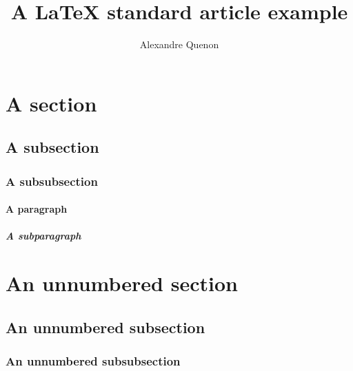 \documentclass[11pt, a4paper]{article}
\title{A \LaTeX{} standard article example}
\author{Alexandre Quenon}
\begin{document}

\maketitle

\tableofcontents


\section{A section}

	\lipsum[1]
	
	
	\subsection{A subsection}
	
		\lipsum[2]
		
		
		\subsubsection{A subsubsection}
		
			\lipsum[3]
			
			
			\paragraph{A paragraph}
			
				\lipsum[4]
				
				
				\subparagraph{A subparagraph}
				
					\lipsum[5]


\section*{An unnumbered section}

	\lipsum[1]
	
	
	\subsection*{An unnumbered subsection}
	
		\lipsum[2]
		
		
		\subsubsection*{An unnumbered subsubsection}
			
			\lipsum[3]



\end{document}
